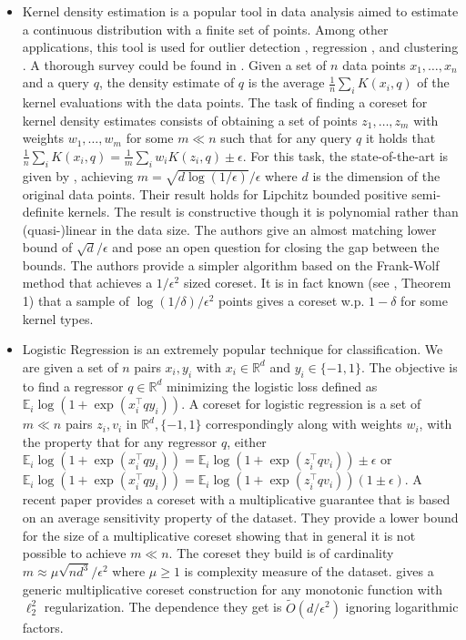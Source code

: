 \documentclass[anon,12pt]{colt2019} %
\newcommand{\R}{\mathbb{R}}
\newcommand{\E}{\mathbb{E}}
\newcommand{\eps}{\epsilon}
\begin{document}
\begin{itemize}
\item Kernel density estimation is a popular tool in data analysis aimed to estimate a continuous distribution with a finite set of points. Among other applications, this tool is used for outlier detection \cite{schubert2014generalized}, regression \cite{fan2018local}, and clustering \cite{rinaldo2010generalized}. A thorough survey could be found in \cite{silverman2018density}. Given a set of $n$ data points $x_1,\ldots,x_n$ and a query $q$, the density estimate of $q$ is the average $\frac{1}{n} \sum_i K(x_i,q)$ of the kernel evaluations with the data points. The task of finding a coreset for kernel density estimates consists of obtaining a set of points $z_1,\ldots,z_m$ with weights $w_1,\ldots,w_m$ for some $m \ll n$ such that for any query $q$ it holds that 
$\frac{1}{n} \sum_i K(x_i,q) = \frac{1}{m} \sum_i w_i K(z_i,q) \pm \eps$. For this task, the state-of-the-art is given by \cite{DBLP:journals/corr/abs-1802-01751}, achieving $m=\sqrt{d\log(1/\eps)}/\eps$ where $d$ is the dimension of the original data points. Their result holds for Lipchitz bounded positive semi-definite kernels. The result is constructive though it is polynomial rather than (quasi-)linear in the data size. The authors give an almost matching lower bound of $\sqrt{d}/\eps$ and pose an open question for closing the gap between the bounds. The authors provide a simpler algorithm based on the Frank-Wolf method that achieves a $1/\eps^2$ sized coreset. It is in fact known (see \cite{lopez2015towards}, Theorem 1) that a sample of $\log(1/\delta)/\eps^2$ points gives a coreset w.p. $1-\delta$ for some kernel types.

\item Logistic Regression is an extremely popular technique for classification. We are given a set of $n$ pairs $x_i,y_i$ with $x_i \in \R^d$ and $y_i \in \{-1,1\}$. The objective is to find a regressor $q \in \R^d$ minimizing the logistic loss defined as $\E_i \log(1+\exp(x_i^\top q y_i))$. A coreset for logistic regression is a set of $m \ll n$ pairs $z_i, v_i$ in $\R^d, \{-1,1\}$ correspondingly along with weights $w_i$, with the property that for any regressor $q$, either $\E_i \log(1+\exp(x_i^\top q y_i)) = \E_i \log(1+\exp(z_i^\top q v_i)) \pm \eps$ or $\E_i \log(1+\exp(x_i^\top q y_i)) = \E_i \log(1+\exp(z_i^\top q v_i)) (1 \pm \eps)$. A recent paper \cite{DBLP:journals/corr/abs-1805-08571} provides a coreset with a multiplicative guarantee that is based on an average sensitivity property of the dataset. They provide a lower bound for the size of a multiplicative coreset showing that in general it is not possible to achieve $m \ll n$. The coreset they build is of cardinality $m \approx \mu\sqrt{nd^3}/\eps^2$ where $\mu \geq 1$ is complexity measure of the dataset.  \cite{tolochinsky2018coresets} gives a generic multiplicative coreset construction for any monotonic function with $\ell_2^2$ regularization. The dependence they get is $\tilde O(d/\eps^2)$ ignoring logarithmic factors.  


\end{itemize}
\end{document}
